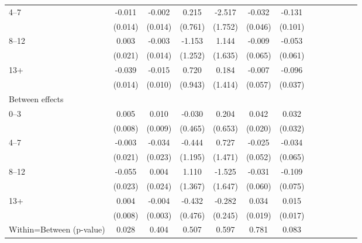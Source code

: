 \documentclass[12pt,english]{article}
\begin{document}
\begin{table}[!ht]
\begin{center}
\begin{adjustbox}{max width=.9\linewidth}
\begin{threeparttable}
{\begin{tabular}{l*{6}{S S}}
						4--7 &    -0.011         &   -0.002         &    0.215         &   -2.517         &   -0.032         &   -0.131         \\
						&  (0.014)         &  (0.014)         &  (0.761)         &  (1.752)         &  (0.046)         &  (0.101)         \\
						8--12 &    0.003         &   -0.003         &   -1.153         &    1.144         &   -0.009         &   -0.053         \\
						&  (0.021)         &  (0.014)         &  (1.252)         &  (1.635)         &  (0.065)         &  (0.061)         \\
						13+ &    -0.039\sym{***}&   -0.015         &    0.720         &    0.184         &   -0.007         &   -0.096\sym{***}\\
						&  (0.014)         &  (0.010)         &  (0.943)         &  (1.414)         &  (0.057)         &  (0.037)         \\
						Between effects&                  &                  &                  &                  &                  &                  \\
						0--3 &    0.005         &    0.010         &   -0.030         &    0.204         &    0.042\sym{**} &    0.032         \\
						&  (0.008)         &  (0.009)         &  (0.465)         &  (0.653)         &  (0.020)         &  (0.032)         \\
						4--7 &    -0.003         &   -0.034         &   -0.444         &    0.727         &   -0.025         &   -0.034         \\
						&  (0.021)         &  (0.023)         &  (1.195)         &  (1.471)         &  (0.052)         &  (0.065)         \\
						8--12 &   -0.055\sym{**} &    0.004         &    1.110         &   -1.525         &   -0.031         &   -0.109         \\
						&  (0.023)         &  (0.024)         &  (1.367)         &  (1.647)         &  (0.060)         &  (0.075)         \\
						13+ &    0.004         &   -0.004         &   -0.432         &   -0.282         &    0.034\sym{*}  &    0.015         \\
						&  (0.008)         &  (0.003)         &  (0.476)         &  (0.245)         &  (0.019)         &  (0.017)         \\
						Within=Between (p-value)&  0.028         &    0.404         &    0.507         &    0.597         &    0.781         &    0.083         \\

\end{tabular}}
\end{threeparttable}
\end{adjustbox}
\end{center}
\end{table}
\end{document}
